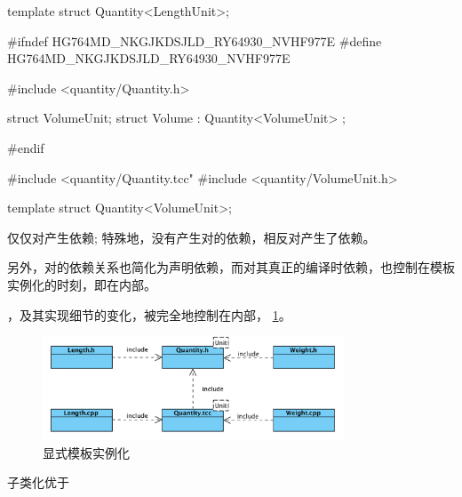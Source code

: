 \begin{content}
\begin{leftbar}
\begin{c++}[caption={\ttfamily{quantity/Length.cpp}}]
template struct Quantity<LengthUnit>;
\end{c++}
\end{leftbar}

\begin{leftbar}
\begin{c++}[caption={\ttfamily{quantity/Volume.h}}]
#ifndef HG764MD_NKGJKDSJLD_RY64930_NVHF977E
#define HG764MD_NKGJKDSJLD_RY64930_NVHF977E

#include <quantity/Quantity.h>

struct VolumeUnit;
struct Volume : Quantity<VolumeUnit> {};

#endif
\end{c++}
\end{leftbar}

\begin{leftbar}
\begin{c++}[caption={\ttfamily{quantity/Volume.cpp}}]
#include <quantity/Quantity.tcc"
#include <quantity/VolumeUnit.h>

template struct Quantity<VolumeUnit>;
\end{c++}
\end{leftbar}

仅仅对产生依赖; 特殊地，没有产生对的依赖，相反对产生了依赖。

另外，对的依赖关系也简化为声明依赖，而对其真正的编译时依赖，也控制在模板实例化的时刻，即在内部。

，及其实现细节的变化，被完全地控制在内部， \ref{fig:explict-template-inst}。 

\begin{figure}
\centering
\includegraphics[width=0.8\textwidth]{figures/explict-template-inst.png}
\caption{显式模板实例化} 
 \label{fig:explict-template-inst}
\end{figure}



\begin{advise}
子类化优于
\end{advise}


\end{content}
